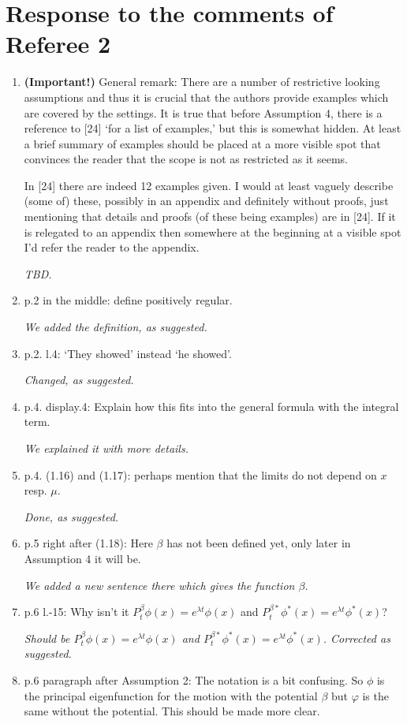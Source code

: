 \documentclass[12pt,a4paper]{amsart}
\numberwithin{equation}{section}
\theoremstyle{plain}
\theoremstyle{definition}
\begin{document}
\section*{Response to the comments of Referee 2}
\begin{enumerate}
\item
  {\bf (Important!)} General remark: There are a number of restrictive looking assumptions and thus it is crucial that the authors provide examples which are covered by the settings.
  It is true that before Assumption 4, there is a reference to [24] `for a list of examples,' but this is somewhat hidden.
  At least a brief summary of examples should be placed at a more visible spot that convinces the reader that the scope is not as restricted as it seems.

  In [24] there are indeed 12 examples given. 
  I would at least vaguely describe (some of) these, possibly in an appendix and definitely without proofs, just mentioning that details and proofs (of these being examples) are in [24].
  If it is relegated to an appendix then somewhere at the beginning at a visible spot I'd refer the reader to the appendix. 
  
  {\it TBD.}
\item
  p.2 in the middle: define positively regular.
  
  {\it We added the definition, as suggested.}
\item
  p.2. l.4: `They showed' instead `he showed'.
  
  {\it Changed, as suggested.}
\item
  p.4. display.4: Explain how this fits into the general formula with the integral term.
  
  {\it We explained it with more details.}
\item
  p.4. (1.16) and (1.17): perhaps mention that the limits do not depend on $x$ resp. $\mu$.
  
  {\it Done, as suggested.}
\item 
  p.5 right after (1.18): Here $\beta$ has not been defined yet, only later in Assumption 4 it will be.
  
  {\it We added a new sentence there which gives the function $\beta$.}
\item
  p.6 l.-15: Why isn't it $P_t^\beta \phi(x) = e^{\lambda t}\phi(x)$ and $P_t^{\beta*} \phi^*(x) = e^{\lambda t}\phi^*(x)$?
  
  {\it Should be $P_t^\beta \phi(x) = e^{\lambda t}\phi(x)$ and $P_t^{\beta*} \phi^*(x) = e^{\lambda t}\phi^*(x)$. Corrected as suggested.}
\item
  p.6 paragraph after Assumption 2: The notation is a bit confusing. So $\phi$ is the principal eigenfunction for the motion with the potential $\beta$ but $\varphi$ is the same without the potential. 
  This should be made more clear.
  

\end{enumerate}
\end{document}
